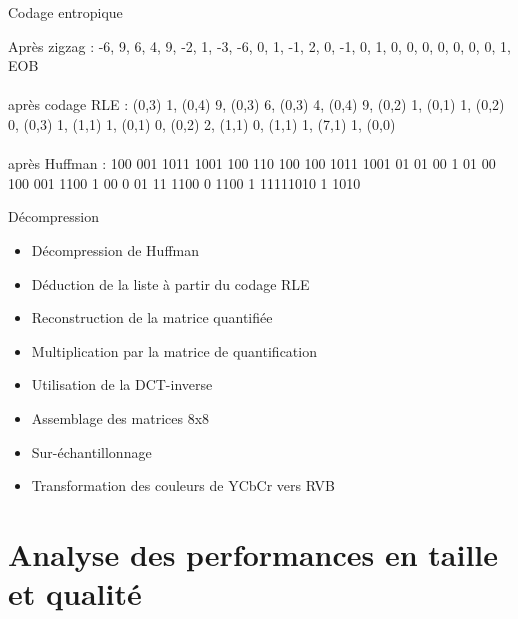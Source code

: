 \documentclass[xcolor=dvipsnames]{beamer}
\begin{document}
\begin{frame} {Codage entropique}
    \scriptsize
    \centering
    
    Après zigzag : -6, 9, 6, 4, 9, -2, 1, -3, -6, 0, 1, -1, 2, 0, -1, 0, 1, 0, 0, 0, 0, 0, 0, 0, 1, EOB \\ \ \\
    après codage RLE : (0,3) 1, (0,4) 9, (0,3) 6, (0,3) 4, (0,4) 9, (0,2) 1, (0,1) 1, (0,2) 0, (0,3) 1, (1,1) 1, (0,1) 0, (0,2) 2, (1,1) 0, (1,1) 1, (7,1) 1, (0,0) \\ \ \\
    après Huffman : 100 001 1011 1001 100 110 100 100 1011 1001 01 01 00 1 01 00 100 001 1100 1 00 0 01 11 1100 0 1100 1 11111010 1 1010

\end{frame}


\begin{frame} {Décompression}

    \begin{itemize}
        \item Décompression de Huffman
        \item Déduction de la liste à partir du codage RLE
        \item Reconstruction de la matrice quantifiée
        \item Multiplication par la matrice de quantification
        \item Utilisation de la DCT-inverse
        \item Assemblage des matrices 8x8
        \item Sur-échantillonnage
        \item Transformation des couleurs de YCbCr vers RVB
    \end{itemize}
\end{frame}


\section{Analyse des performances en taille et qualité}

\begin{frame}
	\sectionpage
\end{frame}
\end{document}
